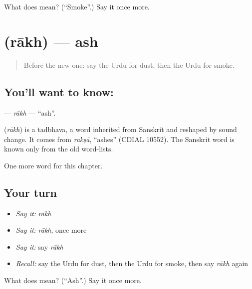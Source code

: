 \begin{tcolorbox}[breakable,colback=teal!4,colframe=teal!35!black,title={Before you move on}]
What does  mean? (\textquotedblleft{}Smoke\textquotedblright{}.) Say it once more.
\end{tcolorbox}
\section[\texorpdfstring{\ur{راکھ} (rākh)}{راکھ (rākh)}]{ (rākh) — ash}

\label{lesson:UR-C206-rakh}



\begin{quote}
Before the new one: say the Urdu for dust, then the Urdu for smoke.
\end{quote}

\subsection*{You'll want to know: }
\textbf{} — \emph{rākh} — \textquotedblleft{}ash\textquotedblright{}.

\begin{cousinweb}
\textbf{} (\emph{rākh}) is a tadbhava, a word inherited from Sanskrit and reshaped by sound change. It comes from \emph{rakṣā}, \textquotedblleft{}ashes\textquotedblright{} (CDIAL 10552). The Sanskrit word is known only from the old word-lists.
\end{cousinweb}

\begin{grammarlens}[title={What you've built}]
One more word for this chapter.
\end{grammarlens}

\subsection*{Your turn}
\begin{itemize}
\raggedright
  \item \emph{Say it:} \emph{rākh}
  \item \emph{Say it:} \emph{rākh}, once more
  \item \emph{Say it:} say \emph{rākh}
  \item \emph{Recall:} say the Urdu for dust, then the Urdu for smoke, then say \emph{rākh} again
\end{itemize}

\begin{tcolorbox}[breakable,colback=teal!4,colframe=teal!35!black,title={Before you move on}]
What does  mean? (\textquotedblleft{}Ash\textquotedblright{}.) Say it once more.
\end{tcolorbox}
